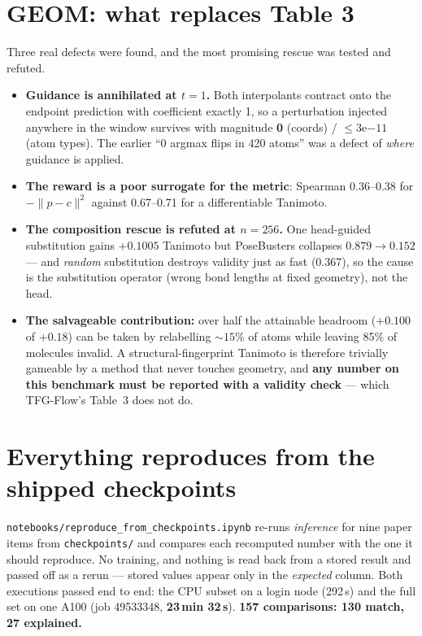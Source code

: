 \documentclass[10pt]{article}
\begin{document}
\section{GEOM: what replaces Table 3}

Three real defects were found, and the most promising rescue was tested and refuted.

\begin{itemize}\itemsep2pt
\item \textbf{Guidance is annihilated at $t{=}1$.} Both interpolants contract onto the endpoint
      prediction with coefficient exactly 1, so a perturbation injected anywhere in the window
      survives with magnitude \textbf{0} (coords) / ${\le}3\mathrm{e}{-11}$ (atom types). The earlier
      ``0 argmax flips in 420 atoms'' was a defect of \emph{where} guidance is applied.
\item \textbf{The reward is a poor surrogate for the metric}: Spearman 0.36--0.38 for
      $-\|p-c\|^2$ against 0.67--0.71 for a differentiable Tanimoto.
\item \textbf{The composition rescue is refuted at $n{=}256$.} One head-guided substitution gains
      $+0.1005$ Tanimoto but PoseBusters collapses $0.879\to0.152$ --- and \emph{random}
      substitution destroys validity just as fast (0.367), so the cause is the substitution operator
      (wrong bond lengths at fixed geometry), not the head.
\item \textbf{The salvageable contribution:} over half the attainable headroom ($+0.100$ of $+0.18$)
      can be taken by relabelling ${\sim}15\%$ of atoms while leaving 85\% of molecules invalid.
      A structural-fingerprint Tanimoto is therefore trivially gameable by a method that never
      touches geometry, and \textbf{any number on this benchmark must be reported with a validity
      check} --- which TFG-Flow's Table~3 does not do.
\end{itemize}

\section{Everything reproduces from the shipped checkpoints}

\texttt{notebooks/reproduce\_from\_checkpoints.ipynb} re-runs \emph{inference} for nine paper items
from \texttt{checkpoints/} and compares each recomputed number with the one it should reproduce.
No training, and nothing is read back from a stored result and passed off as a rerun --- stored
values appear only in the \emph{expected} column. Both executions passed end to end: the CPU subset
on a login node (292\,s) and the full set on one A100 (job 49533348, \textbf{23\,min 32\,s}).
\textbf{157 comparisons: 130 match, 27 explained.}
\end{document}
